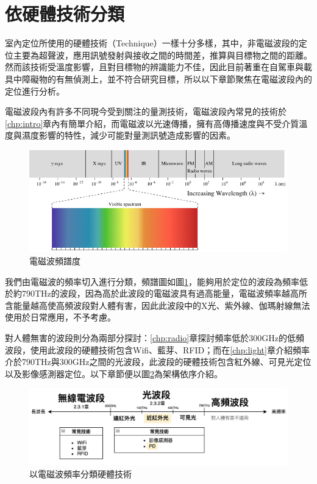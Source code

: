 \section{依硬體技術分類}
\label{chp:technique}

    室內定位所使用的硬體技術（Technique）一樣十分多樣，其中，非電磁波段的定位主要為超聲波，應用訊號發射與接收之間的時間差，推算與目標物之間的距離。然而該技術受溫度影響，且對目標物的辨識能力不佳，因此目前著重在自駕車與載具中障礙物的有無偵測上\cite{survey_ultrasonic}，並不符合研究目標，所以以下章節聚焦在電磁波段內的定位進行分析。

    電磁波段內有許多不同現今受到關注的量測技術，電磁波段內常見的技術於\ref{chp:intro}章內有簡單介紹，而電磁波以光速傳播，擁有高傳播速度與不受介質溫度與濕度影響的特性，減少可能對量測訊號造成影響的因素。

    \begin{figure}[htpb]
        \centering
        \includegraphics[width=12cm]{ch2pic/electro_spectrum.png}
        \caption{電磁波頻譜度\cite{Spectrum}}
        \label{pic:spectrum}
    \end{figure}

    我們由電磁波的頻率切入進行分類，頻譜圖如圖\ref{pic:spectrum}，能夠用於定位的波段為頻率低於約790THz的波段，因為高於此波段的電磁波具有過高能量，電磁波頻率越高所含能量越高使高頻波段對人體有害，因此此波段中的X光、紫外線、伽瑪射線無法使用於日常應用，不予考慮。

    對人體無害的波段則分為兩部分探討：\ref{chp:radio}章探討頻率低於300GHz的低頻波段\cite{book_electromagnetic}，使用此波段的硬體技術包含Wifi、藍芽、RFID；而在\ref{chp:light}章介紹頻率介於790THz與300GHz之間的光波段，此波段的硬體技術包含紅外線、可見光定位以及影像感測器定位。以下章節便以圖\ref{pic:electro_sort}為架構依序介紹。


    \begin{figure}[htpb]
        \centering
        \includegraphics[width=13cm]{ch2pic/electro_sort.png}
        \caption{以電磁波頻率分類硬體技術}
        \label{pic:electro_sort}
    \end{figure}

